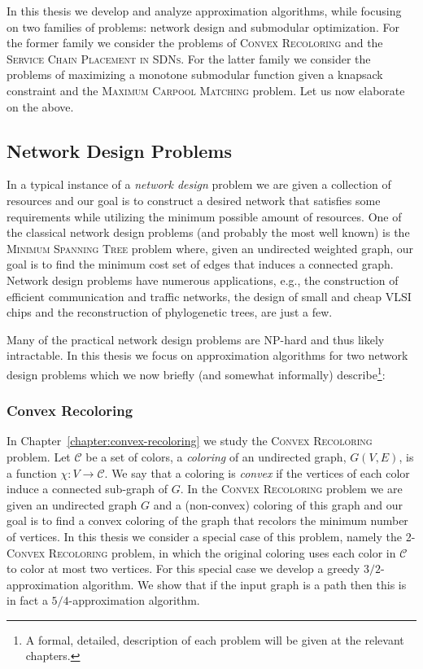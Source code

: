 In this thesis we develop and analyze approximation algorithms, while focusing on two families of problems: network design and submodular optimization.
For the former family we consider the problems of \textsc{Convex Recoloring} and the \textsc{Service Chain Placement in SDNs}.
For the latter family we consider the problems of maximizing a monotone submodular function given a knapsack constraint and the \textsc{Maximum Carpool Matching} problem.
Let us now elaborate on the above.

\subsection*{Network Design Problems}
In a typical instance of a \emph{network design} problem we are given a collection of resources and our goal is to construct a desired network that satisfies some requirements while utilizing the minimum possible amount of resources.
One of the classical network design problems (and probably the most well known) is the \textsc{Minimum Spanning Tree} problem where, given an undirected weighted graph, our goal is to find the minimum cost set of edges that induces a connected graph.
Network design problems have numerous applications, e.g., the construction of efficient communication and traffic networks, the design of small and cheap VLSI chips and the reconstruction of phylogenetic trees, are just a few.

Many of the practical network design problems are NP-hard and thus likely intractable. 
In this thesis we focus on approximation algorithms for two network design problems which we now briefly (and somewhat informally) describe\footnote{A formal, detailed, description of each problem will be given at the relevant chapters.}:


\subsubsection*{Convex Recoloring} 
In Chapter~\ref{chapter:convex-recoloring} we study the \textsc{Convex Recoloring} problem.
Let $\mathcal{C}$ be a set of colors, a \emph{coloring} of an undirected graph, $G(V, E)$, is a function $\chi:V \to \mathcal{C}$.
We say that a coloring is \emph{convex} if the vertices of each color induce a connected sub-graph of $G$.
In the \textsc{Convex Recoloring} problem we are given an undirected graph $G$ and a (non-convex) coloring of this graph and our goal is to find a convex coloring of the graph that recolors the minimum number of vertices.
In this thesis we consider a special case of this problem, namely the \textsc{2-Convex Recoloring} problem, in which the original coloring uses each color in $\mathcal{C}$ to color at most two vertices.
For this special case we develop a greedy $3/2$-approximation algorithm.
We show that if the input graph is a path then this is in fact a $5/4$-approximation algorithm.


